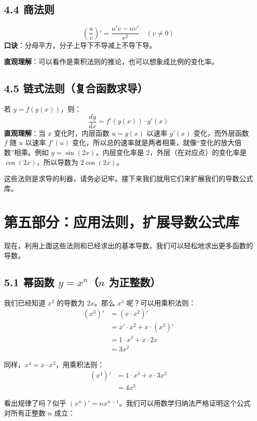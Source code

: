 \documentclass[10pt]{article}
\begin{document}
\subsection*{4.4 商法则}
\[
\left(\frac{u}{v}\right)' = \frac{u'v - uv'}{v^2} \quad (v \neq 0)
\]
\textbf{口诀}：分母平方，分子上导下不导减上不导下导。

\textbf{直观理解}：可以看作是乘积法则的推论，也可以想象成比例的变化率。

\subsection*{4.5 链式法则（复合函数求导）}
若 $y = f(g(x))$，则：
\[
\frac{dy}{dx} = f'(g(x)) \cdot g'(x)
\]
\textbf{直观理解}：当 $x$ 变化时，内层函数 $u=g(x)$ 以速率 $g'(x)$ 变化，而外层函数 $f$ 随 $u$ 以速率 $f'(u)$ 变化，所以总的速率就是两者相乘，就像“变化的放大倍数”相乘。例如 $y = \sin(2x)$，内层变化率是 2，外层（在对应点）的变化率是 $\cos(2x)$，所以导数为 $2\cos(2x)$。

这些法则是求导的利器，请务必记牢。接下来我们就用它们来扩展我们的导数公式库。

\section*{第五部分：应用法则，扩展导数公式库}

现在，利用上面这些法则和已经求出的基本导数，我们可以轻松地求出更多函数的导数。

\subsection*{5.1 幂函数 $y = x^n$（$n$ 为正整数）}
我们已经知道 $x^2$ 的导数为 $2x$。那么 $x^3$ 呢？可以用乘积法则：
\[
\begin{aligned}
(x^3)' &= (x \cdot x^2)' \\
&= x' \cdot x^2 + x \cdot (x^2)' \\
&= 1 \cdot x^2 + x \cdot 2x \\
&= 3x^2
\end{aligned}
\]

同样，$x^4 = x \cdot x^3$，用乘积法则：
\[
\begin{aligned}
(x^4)' &= 1 \cdot x^3 + x \cdot 3x^2 \\
&= 4x^3
\end{aligned}
\]

看出规律了吗？似乎 $(x^n)' = n x^{n-1}$。我们可以用数学归纳法严格证明这个公式对所有正整数 $n$ 成立：
\end{document}
